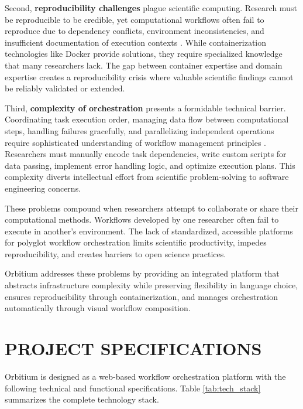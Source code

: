 \documentclass[12pt]{article}
\begin{document}
\hspace{\parindent}Second, \textbf{reproducibility challenges} plague scientific computing. Research must be reproducible to be credible, yet computational workflows often fail to reproduce due to dependency conflicts, environment inconsistencies, and insufficient documentation of execution contexts \cite{stodden2016enhancing}. While containerization technologies like Docker provide solutions, they require specialized knowledge that many researchers lack. The gap between container expertise and domain expertise creates a reproducibility crisis where valuable scientific findings cannot be reliably validated or extended.

\hspace{\parindent}Third, \textbf{complexity of orchestration} presents a formidable technical barrier. Coordinating task execution order, managing data flow between computational steps, handling failures gracefully, and parallelizing independent operations require sophisticated understanding of workflow management principles \cite{liu2015survey}. Researchers must manually encode task dependencies, write custom scripts for data passing, implement error handling logic, and optimize execution plans. This complexity diverts intellectual effort from scientific problem-solving to software engineering concerns.

\hspace{\parindent}These problems compound when researchers attempt to collaborate or share their computational methods. Workflows developed by one researcher often fail to execute in another's environment. The lack of standardized, accessible platforms for polyglot workflow orchestration limits scientific productivity, impedes reproducibility, and creates barriers to open science practices. 

\hspace{\parindent}Orbitium addresses these problems by providing an integrated platform that abstracts infrastructure complexity while preserving flexibility in language choice, ensures reproducibility through containerization, and manages orchestration automatically through visual workflow composition.

\newpage
\section{PROJECT SPECIFICATIONS}

\hspace{\parindent}Orbitium is designed as a web-based workflow orchestration platform with the following technical and functional specifications. Table \ref{tab:tech_stack} summarizes the complete technology stack.
\end{document}
